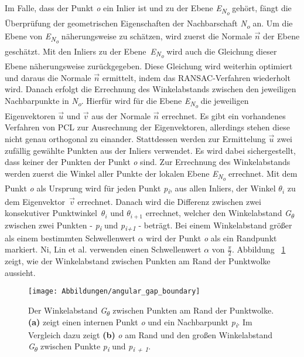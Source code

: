 Im Falle, dass der Punkt \textit{o} ein Inlier ist und zu der Ebene \textit{E\textsubscript{N\textsubscript{o}}} gehört, fängt die Überprüfung der geometrischen Eigenschaften der Nachbarschaft \textit{N\textsubscript{o}} an. Um die Ebene von \textit{E\textsubscript{N\textsubscript{o}}} näherungsweise zu schätzen, wird zuerst die Normale \textit{$\vec{n}$} der Ebene geschätzt. Mit den Inliers zu der Ebene~\textit{E\textsubscript{N\textsubscript{o}}} wird auch die Gleichung dieser Ebene näherungsweise zurückgegeben. Diese Gleichung wird weiterhin optimiert und daraus die Normale \textit{$\vec{n}$} ermittelt, indem das RANSAC-Verfahren wiederholt wird. Danach erfolgt die Errechnung des Winkelabstands zwischen den jeweiligen Nachbarpunkte in \textit{N\textsubscript{o}}. Hierfür wird für die Ebene \textit{E\textsubscript{N\textsubscript{o}}} die jeweiligen Eigenvektoren $\vec{u}$ und $\vec{v}$ aus der Normale $\vec{n}$ errechnet. Es gibt ein vorhandenes Verfahren von PCL zur Ausrechnung der Eigenvektoren, allerdings stehen diese nicht genau orthogonal zu einander. Stattdessen werden zur Ermittelung \textit{$\vec{u}$} zwei zufällig gewählte Punkten aus der Inliers verwendet. Es wird dabei sichergestellt, dass keiner der Punkten der Punkt \textit{o} sind. Zur Errechnung des Winkelabstands werden zuerst die Winkel aller Punkte der lokalen Ebene \textit{E\textsubscript{N\textsubscript{o}}} errechnet. Mit dem Punkt \textit{o} als Ursprung wird für jeden Punkt \textit{p\textsubscript{i}}, aus allen Inliers, der Winkel \textit{$\theta_i$} zu dem Eigenvektor~$\vec{v}$ errechnet. Danach wird die Differenz zwischen zwei konsekutiver Punktwinkel~$\theta_i$ und $\theta_{i+1}$ errechnet, welcher den Winkelabstand \textit{G\textsubscript{$\theta$}} zwischen zwei Punkten - \textit{p\textsubscript{i}} und \textit{p\textsubscript{i+1}} - beträgt. Bei einem Winkelabstand größer als einem bestimmten Schwellenwert $\alpha$ wird der Punkt \textit{o} als ein Randpunkt markiert. Ni, Lin et al. verwenden einen Schwellenwert $\alpha$ von $\frac{\pi}{2}$. Abbildung ~\ref{edge_boundary} zeigt, wie der Winkelabstand zwischen Punkten am Rand der Punktwolke aussieht.

\begin{figure}[t]
	\texttt{[image: Abbildungen/angular\_gap\_boundary]}
	\centering
	\caption{Der Winkelabstand \textit{G\textsubscript{$\theta$}} zwischen Punkten am Rand der Punktwolke. \textbf{(a)} zeigt einen internen Punkt \textit{o} und ein Nachbarpunkt \textit{p\textsubscript{i}}. Im Vergleich dazu zeigt \textbf{(b)} \textit{o} am Rand und den großen Winkelabstand \textit{G\textsubscript{$\theta$}} zwischen Punkte \textit{p\textsubscript{i}} und \textit{p\textsubscript{i + 1}}. \autocite{ni_edge_2016}}
	\label{edge_boundary}
\end{figure}

